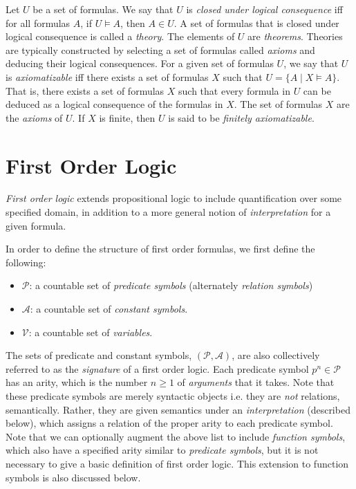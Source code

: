 \documentclass[10pt]{article}
\begin{document}
Let $U$ be a set of formulas. We say that $U$ is \textit{closed under logical consequence} iff for all formulas $A$, if $U \vDash A$, then $A \in U$. A set of formulas that is closed under logical consequence is called a \textit{theory}. The elements of $U$ are \textit{theorems}. Theories are typically constructed by selecting a set of formulas called \textit{axioms} and deducing their logical consequences. For a given set of formulas $U$, we say that $U$ is \textit{axiomatizable} iff there exists a set of formulas $X$ such that $U = \{A \mid X \vDash A\}$. That is, there exists a set of formulas $X$ such that every formula in $U$ can be deduced as a logical consequence of the formulas in $X$. The set of formulas $X$ are the \textit{axioms} of $U$. If $X$ is finite, then $U$ is said to be \textit{finitely axiomatizable}. 

\section{First Order Logic}

\textit{First order logic} extends propositional logic to include quantification over some specified domain, in addition to a more general notion of \textit{interpretation} for a given formula.

In order to define the structure of first order formulas, we first define the following:
\begin{itemize}
    \item $\mathcal{P}$: a countable set of \textit{predicate symbols} (alternately \textit{relation symbols})
    \item  $\mathcal{A}$: a countable set of \textit{constant symbols}.
    \item $\mathcal{V}$: a countable set of \textit{variables}.
\end{itemize}
The sets of predicate and constant symbols, $(\mathcal{P}, \mathcal{A})$, are also collectively referred to as the \textit{signature} of a first order logic. Each predicate symbol $p^n \in \mathcal{P}$ has an arity, which is the number $n \geq 1$ of \textit{arguments} that it takes. Note that these predicate symbols are merely syntactic objects i.e. they are \textit{not} relations, semantically. Rather, they are given semantics under an \textit{interpretation} (described below), which assigns a relation of the proper arity to each predicate symbol. Note that we can optionally augment the above list to include \textit{function symbols}, which also have a specified arity similar to \textit{predicate symbols}, but it is not necessary to give a basic definition of first order logic. This extension to function symbols is also discussed below.
\end{document}
